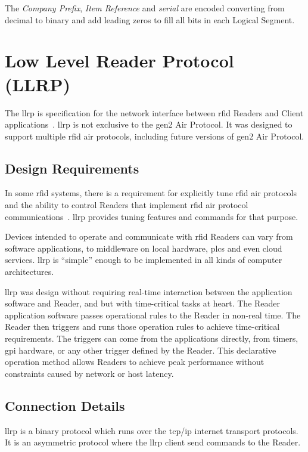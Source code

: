 The \emph{Company Prefix}, \emph{Item Reference} and \emph{serial} are encoded converting from decimal to binary and add leading zeros to fill all bits in each Logical Segment.

\section{Low Level Reader Protocol (LLRP)} \label{sec:llrp}

The \acf{llrp} is specification for the network interface between \ac{rfid} Readers and Client applications~\cite{ImpinjLTKProgrammers}. \ac{llrp} is not exclusive to the \ac{gen2} Air Protocol. It was designed to support multiple \ac{rfid} air protocols, including future versions of \ac{gen2} Air Protocol.

\subsection{Design Requirements}

In some \ac{rfid} systems, there is a requirement for explicitly tune \ac{rfid} air protocols and the ability to control Readers that implement \ac{rfid} air protocol communications~\cite{LowLevelReader}. \ac{llrp} provides tuning features and commands for that purpose.

Devices intended to operate and communicate with \ac{rfid} Readers can vary from software applications, to middleware on local hardware, \acp{plc} and even cloud services. \ac{llrp} is ``simple'' enough to be implemented in all kinds of computer architectures.

\ac{llrp} was design without requiring real-time interaction between the application software and Reader, and but with time-critical tasks at heart. 
The Reader application software passes operational rules to the Reader in non-real time.
The Reader then triggers and runs those operation rules to achieve time-critical requirements. 
The triggers can come from the applications directly, from timers, \ac{gpi} hardware, or any other trigger defined by the Reader. 
This declarative operation method allows Readers to achieve peak performance without constraints caused by network or host latency.

\subsection{Connection Details}

\ac{llrp} is a binary protocol which runs over the \acs{tcp}/\acs{ip} internet transport protocols.
It is an asymmetric protocol where the \ac{llrp} client send commands to the Reader.

